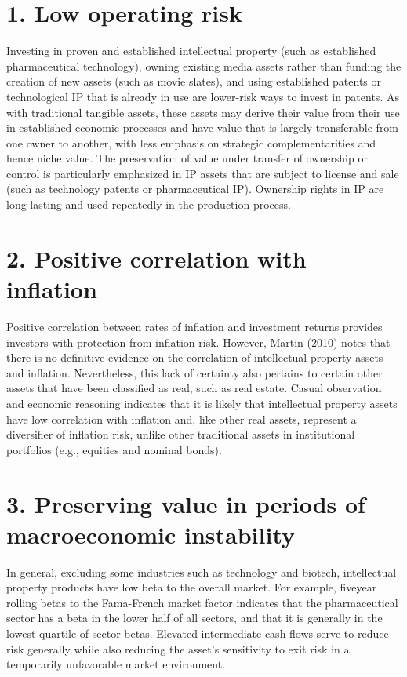 \documentclass[11pt]{article}
\begin{document}
\section*{1. Low operating risk}
Investing in proven and established intellectual property (such as established pharmaceutical technology), owning existing media assets rather than funding the creation of new assets (such as movie slates), and using established patents or technological IP that is already in use are lower-risk ways to invest in patents. As with traditional tangible assets, these assets may derive their value from their use in established economic processes and have value that is largely transferable from one owner to another, with less emphasis on strategic complementarities and hence niche value. The preservation of value under transfer of ownership or control is particularly emphasized in IP assets that are subject to license and sale (such as technology patents or pharmaceutical IP). Ownership rights in IP are long-lasting and used repeatedly in the production process.

\section*{2. Positive correlation with inflation}
Positive correlation between rates of inflation and investment returns provides investors with protection from inflation risk. However, Martin (2010) notes that there is no definitive evidence on the correlation of intellectual property assets and inflation. Nevertheless, this lack of certainty also pertains to certain other assets that have been classified as real, such as real estate. Casual observation and economic reasoning indicates that it is likely that intellectual property assets have low correlation with inflation and, like other real assets, represent a diversifier of inflation risk, unlike other traditional assets in institutional portfolios (e.g., equities and nominal bonds).

\section*{3. Preserving value in periods of macroeconomic instability}
In general, excluding some industries such as technology and biotech, intellectual property products have low beta to the overall market. For example, fiveyear rolling betas to the Fama-French market factor indicates that the pharmaceutical sector has a beta in the lower half of all sectors, and that it is generally in the lowest quartile of sector betas. Elevated intermediate cash flows serve to reduce risk generally while also reducing the asset's sensitivity to exit risk in a temporarily unfavorable market environment.
\end{document}
